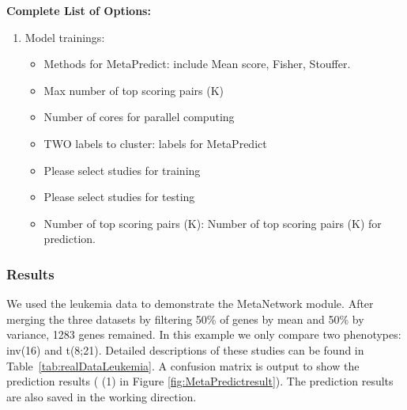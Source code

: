 \textbf{Complete List of Options:} 
\begin{enumerate}
\item Model trainings: 
\begin{itemize}
\item Methods for MetaPredict: include Mean score, Fisher, Stouffer.
\item Max number of top scoring pairs (K)
\item Number of cores for parallel computing
\item TWO labels to cluster: labels for MetaPredict
\item Please select studies for training
\item Please select studies for testing
\item Number of top scoring pairs (K): Number of top scoring pairs (K) for prediction.
\end{itemize}

\end{enumerate}

\subsubsection{Results}

We used the leukemia data to demonstrate the MetaNetwork module.
After merging the three datasets by filtering 50\% of genes by mean and 50\% by variance, 1283 genes remained.
In this example we only compare two phenotypes: inv(16) and t(8;21). 
Detailed descriptions of these studies can be found in Table~\ref{tab:realDataLeukemia}. 
A confusion matrix is output to show the prediction results ({\color{red} (1)} in Figure \ref{fig:MetaPredictresult}).
The prediction results are also saved in the working direction.

